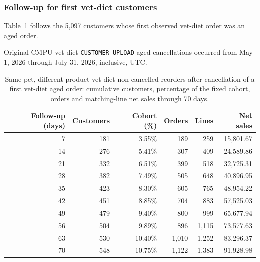 \clearpage
\subsubsection{Follow-up for first vet-diet customers}
Table~\ref{tab:financial-opportunity-new-vet-diet-same-pet-different-part} follows the
5,097 customers whose first observed vet-diet order was an aged order.

Original CMPU vet-diet
\texttt{CUSTOMER\_UPLOAD} aged cancellations occurred from
May 1, 2026 through July 31, 2026, inclusive, UTC.

\begin{table}[!htbp]
\centering
\caption{Same-pet, different-product vet-diet non-cancelled reorders after cancellation of a first vet-diet aged order: cumulative customers, percentage of the fixed cohort, orders and matching-line net sales through 70 days.}
\label{tab:financial-opportunity-new-vet-diet-same-pet-different-part}
\begin{tabular}{@{}rrrrrr@{}}
\toprule
Follow-up (days) & Customers & Cohort (\%) & Orders & Lines & Net sales \\
\midrule
7 & 181 & 3.55\% & 189 & 259 & 15,801.67 \\
14 & 276 & 5.41\% & 307 & 409 & 24,589.86 \\
21 & 332 & 6.51\% & 399 & 518 & 32,725.31 \\
28 & 382 & 7.49\% & 505 & 648 & 40,896.95 \\
35 & 423 & 8.30\% & 605 & 765 & 48,954.22 \\
42 & 451 & 8.85\% & 704 & 883 & 57,525.03 \\
49 & 479 & 9.40\% & 800 & 999 & 65,677.94 \\
56 & 504 & 9.89\% & 896 & 1,115 & 73,577.63 \\
63 & 530 & 10.40\% & 1,010 & 1,252 & 83,296.37 \\
70 & 548 & 10.75\% & 1,122 & 1,383 & 91,928.98 \\
\bottomrule
\end{tabular}


\end{table}
